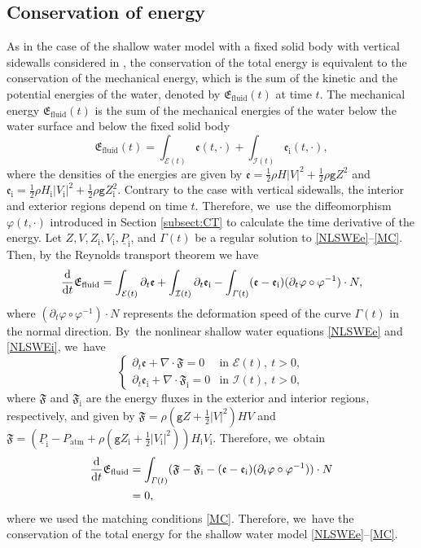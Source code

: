 \documentclass[JEP,XML,SOM,Unicode,NoFloatCountersInSection,published]{cedram}
\newcommand{\gr}{{\mathtt g}}
\newcommand{\dt}{\partial_t}
\newcommand{\cI}{{\mathcal I}}
\newcommand{\cE}{{\mathcal E}}
\newcommand{\ul}[1]{\underline{#1}}
\newcommand{\itGamma}{\mathit{\Gamma}}
\theoremstyle{definition}
\begin{document}
\subsection{Conservation of energy}\label{sectconsNRJ}
As in the case of the shallow water model with a fixed solid body with vertical sidewalls considered in \cite{IguchiLannes2023},
the conservation of the total energy is equivalent to the conservation of the mechanical energy,
which is the sum of the kinetic and the potential energies of the water, denoted by $\mathfrak{E}_\mathrm{fluid}(t)$ at time $t$.
The mechanical energy $\mathfrak{E}_\mathrm{fluid}(t)$ is the sum of the mechanical energies of the water below the water surface and below the fixed solid body
\[
\mathfrak{E}_\mathrm{fluid}(t) = \int_{\cE(t)}\mathfrak{e}(t,\cdot) + \int_{\cI(t)}\mathfrak{e}_\mathrm{i}(t,\cdot),
\]
where the densities of the energies are given by $\mathfrak{e} = \frac12\rho H|V|^2 + \frac12\rho\gr Z^2$
and $\mathfrak{e}_\mathrm{i} = \frac12\rho H_\mathrm{i}|V_\mathrm{i}|^2+\frac12\rho\gr Z_\mathrm{i}^2$.
Contrary to the case with vertical sidewalls, the interior and exterior regions depend on time $t$.
Therefore, we~use the diffeomorphism $\varphi(t,\cdot)$ introduced in Section \ref{subsect:CT} to calculate the time derivative of the energy.
Let $Z,V,Z_\mathrm{i},V_\mathrm{i},\ul{P}_\mathrm{i}$, and $\itGamma(t)$ be a regular solution to \eqref{NLSWEe}--\eqref{MC}.
Then, by the Reynolds transport theorem we have
\[
\frac{\rm d}{{\rm d}t}\mathfrak{E}_\mathrm{fluid}
= \int_{\cE(t)}\dt\mathfrak{e} + \int_{\cI(t)}\dt\mathfrak{e}_\mathrm{i} - \int_{\itGamma(t)}(\mathfrak{e}-\mathfrak{e}_\mathrm{i})(\dt\varphi\circ\varphi^{-1})\cdot N,
\]
where $(\dt\varphi\circ\varphi^{-1})\cdot N$ represents the deformation speed of the curve $\itGamma(t)$ in the normal direction. By~the nonlinear shallow water equations \eqref{NLSWEe} and \eqref{NLSWEi}, we~have
\[
\begin{cases}
\dt\mathfrak{e} + \nabla\cdot\mathfrak{F} = 0 &\text{in } \cE(t), \ t>0, \\
\dt\mathfrak{e}_\mathrm{i} + \nabla\cdot\mathfrak{F}_\mathrm{i} = 0 &\text{in } \cI(t), \ t>0,
\end{cases}
\]
where $\mathfrak{F}$ and $\mathfrak{F}_\mathrm{i}$ are the energy fluxes in the exterior and interior regions, respectively, and given by
$\mathfrak{F}=\rho(\gr Z+\frac12|V|^2)HV$ and $\mathfrak{F}=(\ul{P}_\mathrm{i}-P_\mathrm{atm}+\rho(\gr Z_\mathrm{i}+\frac12|V_\mathrm{i}|^2))H_\mathrm{i}V_\mathrm{i}$.
Therefore, we~obtain
\begin{align*}
\frac{\rm d}{{\rm d}t}\mathfrak{E}_\mathrm{fluid}
&= \int_{\itGamma(t)}(\mathfrak{F}-\mathfrak{F}_\mathrm{i}-(\mathfrak{e}-\mathfrak{e}_\mathrm{i})(\dt\varphi\circ\varphi^{-1}))\cdot N \\
&= 0,
\end{align*}
where we used the matching conditions \eqref{MC}.
Therefore, we~have the conservation of the total energy for the shallow water model \eqref{NLSWEe}--\eqref{MC}.
\end{document}
